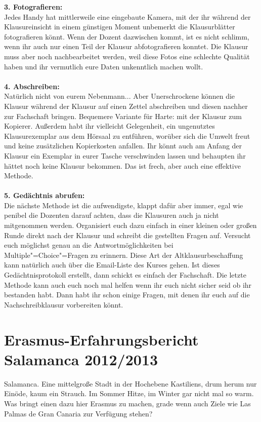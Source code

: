 \textbf{3. Fotografieren:}\\
Jedes Handy hat mittlerweile eine eingebaute Kamera, mit der ihr während der Klausureinsicht in einem günstigen Moment unbemerkt die Klausurblätter fotografieren könnt. Wenn der Dozent dazwischen kommt, ist es nicht schlimm, wenn ihr auch nur einen Teil der Klausur abfotografieren konntet. Die Klausur muss aber noch nachbearbeitet werden, weil diese Fotos eine schlechte Qualität haben und ihr vermutlich eure Daten unkenntlich machen wollt.\\
\\
\textbf{4. Abschreiben:}\\
Natürlich nicht von eurem Nebenmann... Aber Unerschrockene können die Klausur während der Klausur auf einen Zettel abschreiben und diesen nachher zur Fachschaft bringen. Bequemere Variante für Harte: mit der Klausur zum Kopierer. Außerdem habt ihr vielleicht Gelegenheit, ein ungenutztes Klausurexemplar aus dem Hörsaal zu entführen, worüber sich die Umwelt freut und keine zusätzlichen Kopierkosten anfallen. Ihr könnt auch am Anfang der Klausur ein Exemplar in eurer Tasche verschwinden lassen und behaupten ihr hättet noch keine Klausur bekommen. Das ist frech, aber auch eine effektive Methode.\\
\\
\textbf{5. Gedächtnis abrufen:}\\
Die nächste Methode ist die aufwendigste, klappt dafür aber immer, egal wie penibel die Dozenten darauf achten, dass die Klausuren auch ja nicht mitgenommen werden. Organisiert euch dazu einfach in einer kleinen oder großen Runde direkt nach der Klausur und schreibt die gestellten Fragen auf. Versucht euch möglichst genau an die Antwortmöglichkeiten bei Multiple"=Choice"=Fragen zu erinnern. Diese Art der Altklausurbeschaffung kann natürlich auch über die Email-Liste des Kurses gehen. Ist dieses Gedächtnisprotokoll erstellt, dann schickt es einfach der Fachschaft. 
Die letzte Methode kann auch euch noch mal helfen wenn ihr euch nicht sicher seid ob ihr bestanden habt. Dann habt ihr schon einige Fragen, mit denen ihr euch auf die Nachschreibklausur vorbereiten könnt. 

\section{Erasmus-Erfahrungsbericht Salamanca 2012/2013}

Salamanca. Eine mittelgroße Stadt in der Hochebene Kastiliens, drum herum nur Einöde, kaum ein Strauch. Im Sommer Hitze, im Winter gar nicht mal so warm. Was bringt einen dazu hier Erasmus zu machen, grade wenn auch Ziele wie Las Palmas de Gran Canaria zur Verfügung stehen? 

